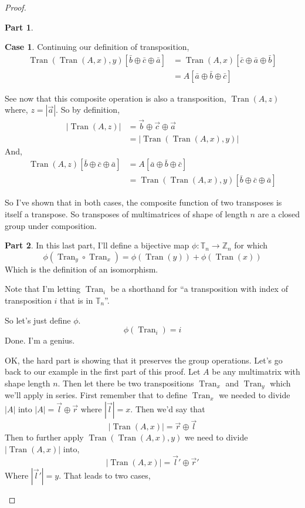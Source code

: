 \documentclass[12pt]{book}
\theoremstyle{plain}
\theoremstyle{definition}
\theoremstyle{ppart}
\newtheorem{ppart}{Part}
\theoremstyle{case}
\newtheorem{case}{Case}
\theoremstyle{solution}
\DeclareMathOperator{\Tran}{Tran}
\newcommand{\shape}[1]{\left|#1\right|}
\begin{document}
\begin{proof}
\begin{ppart}
\begin{case}
Continuing our definition of transposition,
\begin{align*}
  \Tran(\Tran(A, x), y)[\bar{b} \oplus \bar{c} \oplus \bar{a}]
  &=
  \Tran(A, x)[\bar{c} \oplus \bar{a} \oplus \bar{b}] \\
  &=
  A[\bar{a} \oplus \bar{b} \oplus \bar{c}]
\end{align*}

See now that this composite operation is also a transposition, $\Tran(A, z)$ where,
$z = \shape{\vec{a}}$.
So by definition,
\begin{align*}
  \shape{\Tran(A, z)}
  &=
  \vec{b} \oplus \vec{c} \oplus \vec{a} \\
  &=
  \shape{\Tran(\Tran(A, x), y)}  
\end{align*}
And,
\begin{align*}
  \Tran(A, z)[\bar{b} \oplus \bar{c} \oplus \bar{a}]
  &=
  A[\bar{a} \oplus \bar{b} \oplus \bar{c}] \\
  &=
  \Tran(\Tran(A, x), y)[\bar{b} \oplus \bar{c} \oplus \bar{a}]
\end{align*}
\end{case}

So I've shown that in both cases, the composite function of two transposes is
itself a transpose. So transposes of multimatrices of shape of length $n$ are
a closed group under composition.
\end{ppart}

\begin{ppart}
In this last part, I'll define a bijective map
$\phi: \mathbb{T}_n \to \mathbb{Z}_n$ for which
\[ \phi(\Tran_y \circ \Tran_x) = \phi(\Tran(y)) + \phi(\Tran(x)) \]
Which is the definition of an isomorphism.

Note that I'm letting $\Tran_i$ be a shorthand for ``a transposition
with index of transposition $i$ that is in $\mathbb{T}_n$''.

So let's just define $\phi$.
\[ \phi(\Tran_i) = i \]
Done. I'm a genius.

OK, the hard part is showing that it preserves the group operations.
Let's go back to our example in the first part of this proof. Let $A$ be
any multimatrix with shape length $n$. Then let there be two transpositions
$\Tran_x$ and $\Tran_y$ which we'll apply in series. First remember that
to define $\Tran_x$ we needed to divide $\shape{A}$ into $\shape{A} = \vec{l} \oplus \vec{r}$
where $\shape{\vec{l}} = x$. Then we'd say that
\[ \shape{\Tran(A, x)} = \vec{r} \oplus \vec{l} \]
Then to further apply $\Tran(\Tran(A, x), y)$ we need to divide $\shape{\Tran(A,x)}$
into,
\[ \shape{\Tran(A, x)} = \vec{l}' \oplus \vec{r}' \]
Where $\shape{\vec{l}'} = y$.
That leads to two cases,


\end{ppart}
\end{proof}
\end{document}
